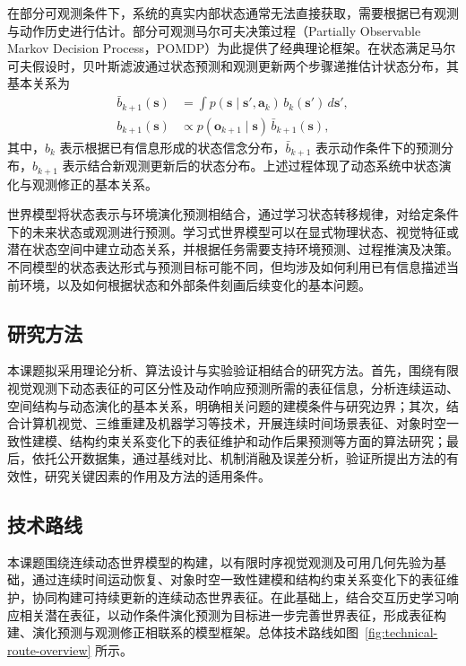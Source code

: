在部分可观测条件下，系统的真实内部状态通常无法直接获取，需要根据已有观测与动作历史进行估计。部分可观测马尔可夫决策过程（Partially Observable Markov Decision Process，POMDP）为此提供了经典理论框架\cite{pomdp1998}。在状态满足马尔可夫假设时，贝叶斯滤波通过状态预测和观测更新两个步骤递推估计状态分布，其基本关系为
\begin{equation}
\begin{aligned}
  \bar b_{k+1}(\mathbf{s})
  &= \int p(\mathbf{s}\mid\mathbf{s}',\mathbf{a}_k)\,
  b_k(\mathbf{s}')\,d\mathbf{s}',\\
  b_{k+1}(\mathbf{s})
  &\propto p(\mathbf{o}_{k+1}\mid\mathbf{s})\,
  \bar b_{k+1}(\mathbf{s}),
\end{aligned}
\label{eq:plan-bayes-filter}
\end{equation}
其中，$b_k$ 表示根据已有信息形成的状态信念分布，$\bar b_{k+1}$ 表示动作条件下的预测分布，$b_{k+1}$ 表示结合新观测更新后的状态分布。上述过程体现了动态系统中状态演化与观测修正的基本关系。

世界模型将状态表示与环境演化预测相结合，通过学习状态转移规律，对给定条件下的未来状态或观测进行预测。学习式世界模型可以在显式物理状态、视觉特征或潜在状态空间中建立动态关系，并根据任务需要支持环境预测、过程推演及决策\cite{worldmodels2018,ref01,dreamer2020,ref02}。不同模型的状态表达形式与预测目标可能不同，但均涉及如何利用已有信息描述当前环境，以及如何根据状态和外部条件刻画后续变化的基本问题。


\subsection{研究方法}

本课题拟采用理论分析、算法设计与实验验证相结合的研究方法。首先，围绕有限视觉观测下动态表征的可区分性及动作响应预测所需的表征信息，分析连续运动、空间结构与动态演化的基本关系，明确相关问题的建模条件与研究边界；其次，结合计算机视觉、三维重建及机器学习等技术，开展连续时间场景表征、对象时空一致性建模、结构约束关系变化下的表征维护和动作后果预测等方面的算法研究；最后，依托公开数据集，通过基线对比、机制消融及误差分析，验证所提出方法的有效性，研究关键因素的作用及方法的适用条件。



\subsection{技术路线}
\label{sec:plan-route}

本课题围绕连续动态世界模型的构建，以有限时序视觉观测及可用几何先验为基础，通过连续时间运动恢复、对象时空一致性建模和结构约束关系变化下的表征维护，协同构建可持续更新的连续动态世界表征。在此基础上，结合交互历史学习响应相关潜在表征，以动作条件演化预测为目标进一步完善世界表征，形成表征构建、演化预测与观测修正相联系的模型框架。总体技术路线如图~\ref{fig:technical-route-overview} 所示。

